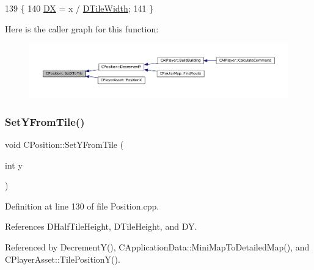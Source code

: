 \begin{DoxyCode}
139                                \{
140     \hyperlink{classCPosition_a28445f9b872169715919074d82044eda}{DX} = x / \hyperlink{classCPosition_ac17d12fb5d35fcf62d63bb42e8cf7ed6}{DTileWidth};
141 \}
\end{DoxyCode}
Here is the caller graph for this function\+:\nopagebreak
\begin{figure}[H]
\begin{center}
\leavevmode
\includegraphics[width=350pt]{classCPosition_a12795d06d34e608697b7b4c9bf202a10_icgraph}
\end{center}
\end{figure}
\hypertarget{classCPosition_a4be1caa5ce58297e9d371f6bc1db32d9}{}\label{classCPosition_a4be1caa5ce58297e9d371f6bc1db32d9} 
\subsubsection{\texorpdfstring{Set\+Y\+From\+Tile()}{SetYFromTile()}}
{\footnotesize\ttfamily void C\+Position\+::\+Set\+Y\+From\+Tile (\begin{DoxyParamCaption}\item[{int}]{y }\end{DoxyParamCaption})}



Definition at line 130 of file Position.\+cpp.



References D\+Half\+Tile\+Height, D\+Tile\+Height, and DY.



Referenced by Decrement\+Y(), C\+Application\+Data\+::\+Mini\+Map\+To\+Detailed\+Map(), and C\+Player\+Asset\+::\+Tile\+Position\+Y().


